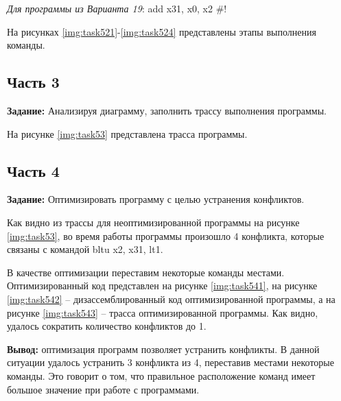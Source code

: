 \textit{Для программы из Варианта 19}: add x31, x0, x2 \#!

На рисунках \ref{img:task521}-\ref{img:task524} представлены этапы выполнения команды.


\clearpage


\subsection{Часть 3}

\textbf{Задание:} Анализируя диаграмму, заполнить трассу выполнения программы.

На рисунке \ref{img:task53} представлена трасса программы.


\clearpage



\subsection{Часть 4}

\textbf{Задание:} Оптимизировать программу с целью устранения конфликтов.

Как видно из трассы для неоптимизированной программы на рисунке \ref{img:task53}, во время работы программы произошло 4 конфликта, которые связаны с командой bltu x2, x31, lt1. 

В качестве оптимизации переставим некоторые команды местами. Оптимизированный код представлен на рисунке \ref{img:task541}, на рисунке \ref{img:task542} -- дизассемблированный код оптимизированной программы, а на рисунке \ref{img:task543} -- трасса оптимизированной программы. Как видно, удалось сократить количество конфликтов до 1.


\clearpage


\textbf{Вывод:} оптимизация программ позволяет устранить конфликты. В данной ситуации удалось устранить 3 конфликта из 4, переставив местами некоторые команды. Это говорит о том, что правильное расположение команд имеет большое значение при работе с программами.